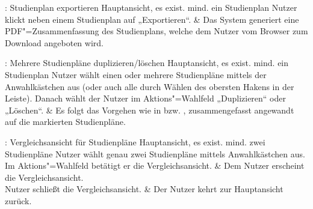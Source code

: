 \begin{usecase}{: Studienplan exportieren}
	{Hauptansicht, es exist. mind. ein Studienplan}
	Nutzer klickt neben einem Studienplan auf „Exportieren“.
	& Das System generiert eine PDF"=Zusammenfassung des Studienplans, welche dem Nutzer vom Browser zum Download angeboten wird.
\end{usecase}

\begin{usecase}{: Mehrere Studienpläne duplizieren/löschen}
	{Hauptansicht, es exist. mind. ein Studienplan}
	Nutzer wählt einen oder mehrere Studienpläne mittels der Anwahlkästchen aus (oder auch alle durch Wählen des obersten Hakens in der Leiste).
	Danach wählt der Nutzer im Aktions"=Wahlfeld „Duplizieren“ oder „Löschen“.
	& Es folgt das Vorgehen wie in  bzw. , zusammengefasst angewandt auf die markierten Studienpläne.
\end{usecase}

\begin{usecase}{: Vergleichsansicht für Studienpläne}
	{Hauptansicht, es exist. mind. zwei Studienpläne}
	Nutzer wählt genau zwei Studienpläne mittels Anwahlkästchen aus. Im Aktions"=Wahlfeld betätigt er die Vergleichsansicht.
	& Dem Nutzer erscheint die Vergleichsansicht. \\
	\hline
	Nutzer schließt die Vergleichsansicht. 
	& Der Nutzer kehrt zur Hauptansicht zurück.
\end{usecase}

